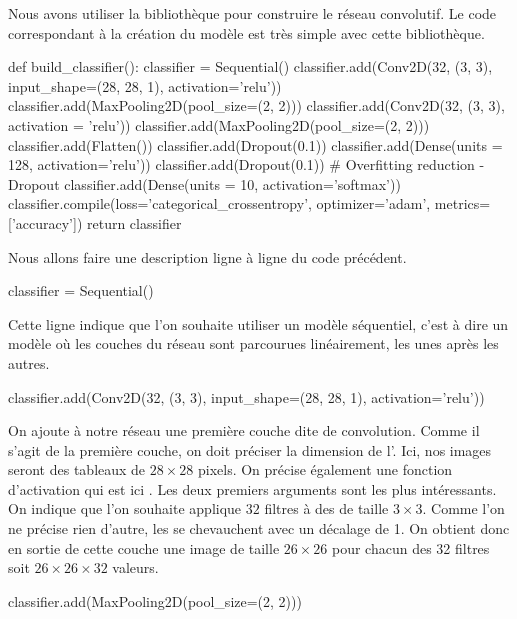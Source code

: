 Nous avons utiliser la bibliothèque \Python {} pour construire 
le réseau convolutif. 
Le code correspondant à la création du modèle est très simple avec cette 
bibliothèque.

\begin{codeblock}
def build_classifier():
    classifier = Sequential()
    classifier.add(Conv2D(32, (3, 3), input_shape=(28, 28, 1), activation='relu'))
    classifier.add(MaxPooling2D(pool_size=(2, 2)))
    classifier.add(Conv2D(32, (3, 3), activation = 'relu'))
    classifier.add(MaxPooling2D(pool_size=(2, 2)))
    classifier.add(Flatten())
    classifier.add(Dropout(0.1)) 
    classifier.add(Dense(units = 128, activation='relu'))
    classifier.add(Dropout(0.1)) # Overfitting reduction - Dropout
    classifier.add(Dense(units = 10, activation='softmax'))
    classifier.compile(loss='categorical_crossentropy', optimizer='adam', metrics=['accuracy'])
    return classifier
\end{codeblock}

Nous allons faire une description ligne à ligne du code précédent.

\begin{codeblock}
classifier = Sequential()
\end{codeblock}

Cette ligne indique que l'on souhaite utiliser un modèle séquentiel, 
c'est à dire un modèle où les couches du réseau sont parcourues linéairement, 
les unes après les autres.

\begin{codeblock}
classifier.add(Conv2D(32, (3, 3), input_shape=(28, 28, 1), activation='relu'))
\end{codeblock}

On ajoute à notre réseau une première couche dite de convolution. 
Comme il s'agit de la première couche, on doit préciser la dimension de 
l'. 
Ici, nos images seront des tableaux de $28 \times 28$ pixels.  
On précise également une fonction d'activation qui est ici .
Les deux premiers arguments sont les plus intéressants. 
On indique que l'on souhaite applique $32$ filtres à des  de taille 
$3 \times 3$. 
Comme l'on ne précise rien d'autre, les  se chevauchent avec un décalage 
de 1. 
On obtient donc en sortie de cette couche une image de taille $26 \times 26$ pour 
chacun des 32 filtres soit $26 \times 26 \times 32$ valeurs.

\begin{codeblock}
classifier.add(MaxPooling2D(pool_size=(2, 2)))
\end{codeblock}

